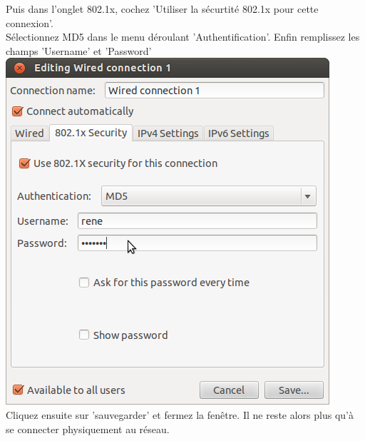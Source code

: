 Puis dans l'onglet 802.1x, cochez 'Utiliser la sécurtité 802.1x pour cette connexion'.\\
Sélectionnez MD5 dans le menu déroulant 'Authentification'. Enfin remplissez les champs 'Username' et 'Password'\\
\includegraphics[width=\screenShotSize{}]{imgUser/md5.png}\\
Cliquez ensuite sur 'sauvegarder' et fermez la fenêtre.
Il ne reste alors plus qu'à se connecter physiquement au réseau.


